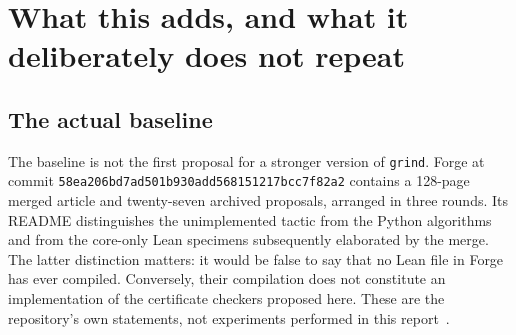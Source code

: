 \documentclass[11pt,a4paper]{article}
\theoremstyle{definition}\newtheorem{definition}[theorem]{Definition}
\theoremstyle{remark}\newtheorem{remark}[theorem]{Remark}
\newcommand{\code}[1]{\nolinkurl{#1}}
\begin{document}
\begin{abstract}
Forge's merged design already contains structural proof planning, nonlinear arithmetic, finite-dimensional and ideal closures, finite-state quantitative reasoning, and nonprobabilistic pushdown summaries. Repeating those proposals would add little. This report crosses two of their remaining semantic boundaries: an unbounded natural-number state space and a nonlinear least fixed point whose value need not be rational.

The first extension computes a finite antichain describing the backward coverability set of a Petri net. A negative result is checked by finite predecessor-closure inequalities; a positive result is checked by an ordinary execution. The second computes rational lower and upper bounds for a probabilistic polynomial system. Lower bounds carry a rounded Newton ledger, not merely a fixed-point equation. A weighted maximum principle replaces full inverse matrices by two vectors per Newton step. A third certificate proves exact extinction probability one in a strongly connected critical or subcritical branching system, while rejecting the deterministic one-child exception. Finally, a factorization and rational isolating interval can identify an irrational least fixed point exactly.

The mathematics is based on established coverability and probabilistic-polynomial-system methods. The contribution is the concrete extension of Forge's certificate language, the soundness decomposition, executable producers and checkers, and a narrowly specified Lean port. Search success, finite-checker acceptance, numerical diagnostics, source-level proofs, and compilation remain distinct throughout.
\end{abstract}
\begingroup
\small
\setlength{\parskip}{0pt}
\tableofcontents
\endgroup
\newpage
{}

\section{What this adds, and what it deliberately does not repeat}
\subsection{The actual baseline}
The baseline is not the first proposal for a stronger version of \code{grind}. Forge at commit \code{58ea206bd7ad501b930add568151217bcc7f82a2} contains a 128-page merged article and twenty-seven archived proposals, arranged in three rounds. Its README distinguishes the unimplemented tactic from the Python algorithms and from the core-only Lean specimens subsequently elaborated by the merge. The latter distinction matters: it would be false to say that no Lean file in Forge has ever compiled. Conversely, their compilation does not constitute an implementation of the certificate checkers proposed here. These are the repository's own statements, not experiments performed in this report~\cite{forge-readme}.
\end{document}
